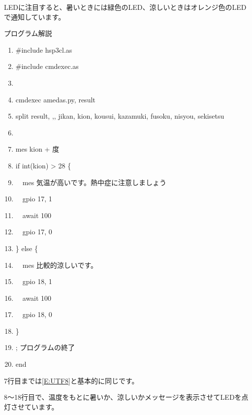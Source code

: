 \documentclass[a4paper,12pt,dvipdfmx]{jarticle}
\begin{document}
LEDに注目すると、暑いときには緑色のLED、涼しいときはオレンジ色のLEDで通知しています。


\bigskip


\bigskip

\clearpage
プログラム解説



\begin{center}
\begin{boxedminipage}{15.272cm}
\begin{enumerate}
\setlength{\itemsep}{0cm} %
\item \#include {\textquotedbl}hsp3cl.as{\textquotedbl}
\item \#include {\textquotedbl}cmdexec.as{\textquotedbl}
\item 
\item cmdexec {\textquotedbl}amedas.py{\textquotedbl}, result
\item split result, {\textquotedbl},{\textquotedbl}, jikan, kion, kousui, kazamuki, fusoku, nisyou, sekisetsu
\item 
\item mes kion + {\textquotedbl}度{\textquotedbl}
\item if int(kion) {\textgreater} 28 \{
\item \ \ mes
{\textquotedbl}気温が高いです。熱中症に注意しましょう{\textquotedbl}
\item \ \ gpio 17, 1
\item \ \ await 100
\item \ \ gpio 17, 0
\item \} else \{
\item \ \ mes {\textquotedbl}比較的涼しいです。{\textquotedbl}
\item \ \ gpio 18, 1
\item \ \ await 100
\item \ \ gpio 18, 0
\item \}
\item ; プログラムの終了
\item end
\end{enumerate}
\end{boxedminipage}
\end{center}

\bigskip



\bigskip

7行目までは\ref*{E:UTF8}と基本的に同じです。

8〜18行目で、温度をもとに暑いか、涼しいかメッセージを表示させてLEDを点灯させています。
\end{document}
